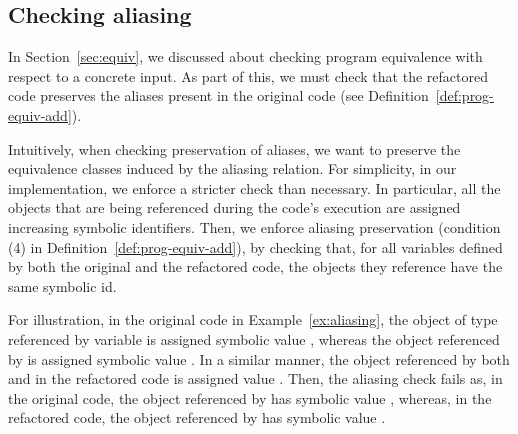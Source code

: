\documentclass[sigconf,review,anonymous]{acmart}
\begin{document}


\subsection{Checking aliasing}

In Section~\ref{sec:equiv}, we discussed about checking program equivalence with respect to a concrete input. As part of this, 
we must check that the refactored code preserves the aliases present in the original code (see Definition~\ref{def:prog-equiv-add}).



Intuitively, when checking preservation of aliases, we want to preserve the equivalence classes induced by the aliasing relation.
For simplicity, in our implementation, we enforce a stricter check than necessary.
In particular, all the objects
that are being referenced during the code's execution
are assigned increasing symbolic identifiers.
Then, we enforce aliasing preservation (condition (4) in Definition~\ref{def:prog-equiv-add}),
by checking that, for all variables defined by both the original and the refactored code,
the objects they reference have the same symbolic id.

For illustration, in the original code in Example~\ref{ex:aliasing}, the object of type  referenced by variable 
is assigned symbolic value , whereas the object referenced by  is assigned symbolic value .
In a similar manner, the object referenced by both  and  in the refactored code is assigned value .
Then, the aliasing check fails as, in the original code, the object referenced by  has symbolic value ,
whereas, in the refactored code, the object referenced by  has symbolic value .
\end{document}
